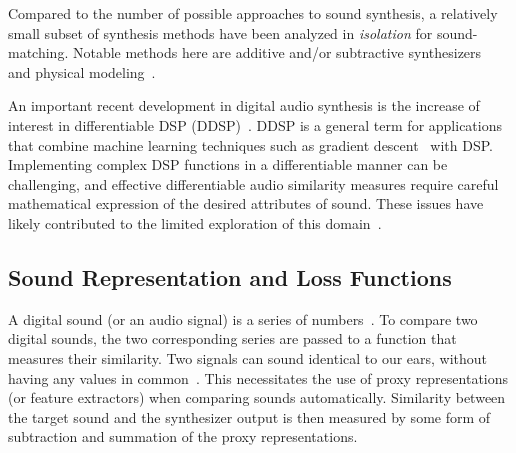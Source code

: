 Compared to the number of possible approaches to sound synthesis, a relatively small subset of synthesis methods have been analyzed in \textit{isolation} for sound-matching. Notable methods here are additive and/or subtractive synthesizers~\cite{engel2020ddsp,masuda2023improving,salimi2020make} and physical modeling~\cite{riionheimo2003parameter,han2024learning}.


An important recent development in digital audio synthesis is the increase of interest in differentiable DSP (\gls{DDSP})~\cite{engel2020ddsp}. DDSP is a general term for applications that combine machine learning techniques such as gradient descent~\cite{goodfellow2016deep,boyd2004convex} with DSP. Implementing complex DSP functions in a differentiable manner can be challenging, and effective differentiable audio similarity measures require careful mathematical expression of the desired attributes of sound. These issues have likely contributed to the limited exploration of this domain~\cite{masuda2021soundmatch,vahidi2023mesostructures,uzrad2024diffmoog}. 


\subsection{Sound Representation and Loss Functions}
\label{sec:loss_funcs}
A digital sound (or an audio signal) is a series of numbers~\cite{smith1991viewpoints,smith2007mathematics}. To compare two digital sounds, the two corresponding series are passed to a function that measures their similarity. Two signals can sound identical to our ears, without having any values in common~\cite{moore2012introduction}. This necessitates the use of proxy representations (or feature extractors) when comparing sounds automatically. Similarity between the target sound and the synthesizer output is then measured by some form of subtraction and summation of the proxy representations.

